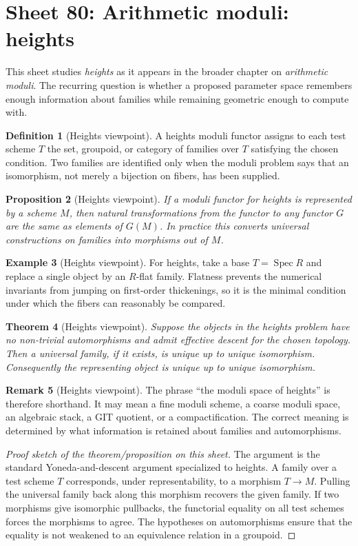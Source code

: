 \documentclass[11pt]{amsart}
\newtheorem{theorem}{Theorem}[section]
\newtheorem{proposition}[theorem]{Proposition}
\theoremstyle{definition}
\newtheorem{definition}[theorem]{Definition}
\newtheorem{example}[theorem]{Example}
\newtheorem{remark}[theorem]{Remark}
\newcommand{\Spec}{\operatorname{Spec}}
\begin{document}
\section{Sheet 80: Arithmetic moduli: heights}
This sheet studies \emph{heights} as it appears in the broader chapter on \emph{arithmetic moduli}.  The recurring question is whether a proposed parameter space remembers enough information about families while remaining geometric enough to compute with.
\begin{definition}[Heights viewpoint]
A heights moduli functor assigns to each test scheme $T$ the set, groupoid, or category of families over $T$ satisfying the chosen condition.  Two families are identified only when the moduli problem says that an isomorphism, not merely a bijection on fibers, has been supplied.
\end{definition}
\begin{proposition}[Heights viewpoint]
If a moduli functor for heights is represented by a scheme $M$, then natural transformations from the functor to any functor $G$ are the same as elements of $G(M)$.  In practice this converts universal constructions on families into morphisms out of $M$.
\end{proposition}
\begin{example}[Heights viewpoint]
For heights, take a base $T=\Spec R$ and replace a single object by an $R$-flat family.  Flatness prevents the numerical invariants from jumping on first-order thickenings, so it is the minimal condition under which the fibers can reasonably be compared.
\end{example}
\begin{theorem}[Heights viewpoint]
Suppose the objects in the heights problem have no non-trivial automorphisms and admit effective descent for the chosen topology.  Then a universal family, if it exists, is unique up to unique isomorphism.  Consequently the representing object is unique up to unique isomorphism.
\end{theorem}
\begin{remark}[Heights viewpoint]
The phrase ``the moduli space of heights'' is therefore shorthand.  It may mean a fine moduli scheme, a coarse moduli space, an algebraic stack, a GIT quotient, or a compactification.  The correct meaning is determined by what information is retained about families and automorphisms.
\end{remark}
\begin{proof}[Proof sketch of the theorem/proposition on this sheet]
The argument is the standard Yoneda-and-descent argument specialized to heights.  A family over a test scheme $T$ corresponds, under representability, to a morphism $T\to M$.  Pulling the universal family back along this morphism recovers the given family.  If two morphisms give isomorphic pullbacks, the functorial equality on all test schemes forces the morphisms to agree.  The hypotheses on automorphisms ensure that the equality is not weakened to an equivalence relation in a groupoid.
\end{proof}
\end{document}
